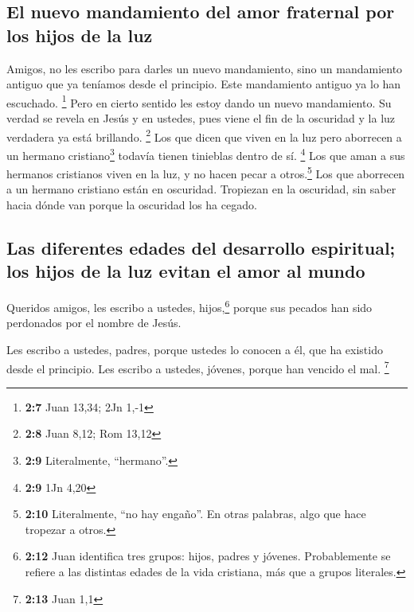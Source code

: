 \hypertarget{el-nuevo-mandamiento-del-amor-fraternal-por-los-hijos-de-la-luz}{%
\subsection{El nuevo mandamiento del amor fraternal por los hijos de la
luz}\label{el-nuevo-mandamiento-del-amor-fraternal-por-los-hijos-de-la-luz}}

 Amigos, no les escribo para darles un nuevo mandamiento,
sino un mandamiento antiguo que ya teníamos desde el principio. Este
mandamiento antiguo ya lo han escuchado. \footnote{\textbf{2:7} Juan
  13,34; 2Jn 1,-1}  Pero en cierto sentido les estoy dando
un nuevo mandamiento. Su verdad se revela en Jesús y en ustedes, pues
viene el fin de la oscuridad y la luz verdadera ya está brillando.
\footnote{\textbf{2:8} Juan 8,12; Rom 13,12}  Los que
dicen que viven en la luz pero aborrecen a un hermano
cristiano\footnote{\textbf{2:9} Literalmente, ``hermano''.} todavía
tienen tinieblas dentro de sí. \footnote{\textbf{2:9} 1Jn 4,20}
 Los que aman a sus hermanos cristianos viven en la luz,
y no hacen pecar a otros.\footnote{\textbf{2:10} Literalmente, ``no hay
  engaño''. En otras palabras, algo que hace tropezar a otros.}
 Los que aborrecen a un hermano cristiano están en
oscuridad. Tropiezan en la oscuridad, sin saber hacia dónde van porque
la oscuridad los ha cegado.

\hypertarget{las-diferentes-edades-del-desarrollo-espiritual-los-hijos-de-la-luz-evitan-el-amor-al-mundo}{%
\subsection{Las diferentes edades del desarrollo espiritual; los hijos
de la luz evitan el amor al
mundo}\label{las-diferentes-edades-del-desarrollo-espiritual-los-hijos-de-la-luz-evitan-el-amor-al-mundo}}

 Queridos amigos, les escribo a ustedes,
hijos,\footnote{\textbf{2:12} Juan identifica tres grupos: hijos, padres
  y jóvenes. Probablemente se refiere a las distintas edades de la vida
  cristiana, más que a grupos literales.} porque sus pecados han sido
perdonados por el nombre de Jesús.

 Les escribo a ustedes, padres, porque ustedes lo conocen
a él, que ha existido desde el principio. Les escribo a ustedes,
jóvenes, porque han vencido el mal. \footnote{\textbf{2:13} Juan 1,1}


